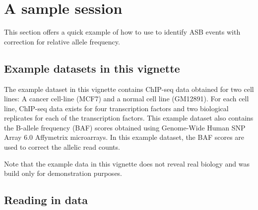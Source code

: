 \documentclass{article}\usepackage[]{graphicx}\usepackage[usenames,dvipsnames]{color}
\begin{document}
\section{A sample session}

This section offers a quick example of how to use  to identify ASB events with correction for relative allele frequency.

\subsection{Example datasets in this vignette}

The example dataset in this vignette contains ChIP-seq data obtained for two cell lines: A cancer cell-line (MCF7) and a normal cell line (GM12891). For each cell line, ChIP-seq data exists for four transcription factors and two biological replicates for each of the transcription factors. This example dataset also contains the B-allele frequency (BAF) scores obtained using Genome-Wide Human SNP Array 6.0 Affymetrix microarrays. In this example dataset, the BAF scores are used to correct the allelic read counts.


Note that the example data in this vignette does not reveal real biology and was build only for demonstration purposes.

\subsection{Reading in data}
\end{document}
